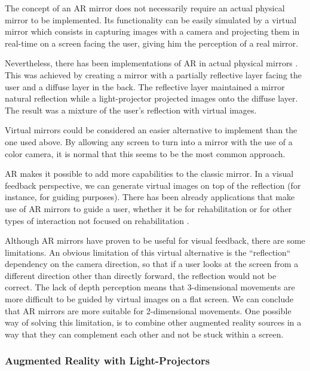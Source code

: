 \documentclass[runningheads]{llncs}
\begin{document}
The concept of an \ac{AR} mirror does not necessarily require an 
actual physical mirror to be implemented. 
Its functionality can be easily simulated by a virtual mirror 
which consists in capturing images with a camera and projecting 
them in real-time on a screen facing the user, 
giving him the perception of a real mirror. 

Nevertheless, there has been implementations of \ac{AR} in actual physical mirrors \cite{Anderson}. 
This was achieved by creating a mirror with a partially reflective layer facing the user and a diffuse layer in the back. 
The reflective layer maintained a mirror natural reflection while a light-projector projected images onto the diffuse layer.
The result was a mixture of the user's reflection with virtual images.

Virtual mirrors could be considered an easier alternative to implement than the one used above. 
By allowing any screen to turn into a mirror with the use of a color camera, 
it is normal that this seems to be the most common approach.

%

\ac{AR} makes it possible to add more capabilities to the classic mirror. In a visual feedback perspective, we can generate virtual images on top of the reflection (for instance, for guiding purposes). There has been already applications that make use of \ac{AR} mirrors to guide a user, whether it be for rehabilitation \cite{Tang2014a, Velloso2013, Klein2013} or for other types of interaction not focused on rehabilitation \cite{Alhamid2012a, blum2012}.

Although \ac{AR} mirrors have proven to be useful for visual feedback, there are some limitations. 
An obvious limitation of this virtual alternative is the ``reflection`` dependency on the camera direction, 
so that if a user looks at the screen from a different direction
other than directly forward, the reflection would not be correct.
The lack of depth perception means that 3-dimensional movements are more difficult to be guided by virtual images on a flat screen. We can conclude that \ac{AR} mirrors are more suitable for 2-dimensional movements. One possible way of solving this limitation, is to combine other augmented reality sources in a way that they can complement each other and not be stuck within a screen.


\subsubsection{Augmented Reality with Light-Projectors}
\label{RW-projectionmapping}
\end{document}
